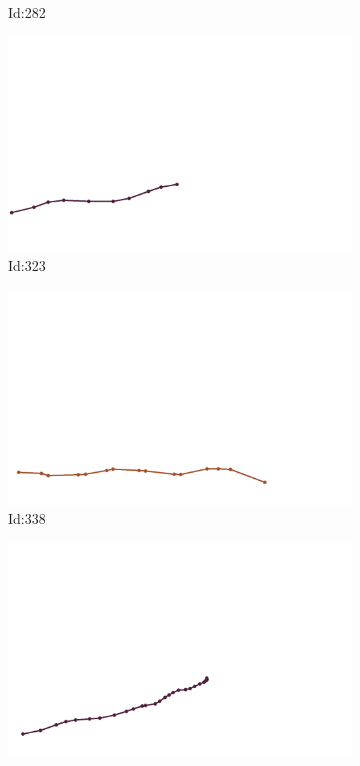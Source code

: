 \documentclass[12pt,twoside]{report}
\begin{document}
\begin{figure}
\begin{subfigure}[b]{0.20\textwidth}
\caption{Id:282}
\end{subfigure}
\begin{subfigure}[b]{0.20\textwidth}
\centering
\includegraphics[width=\textwidth]{../trajectories/323.png}
\caption{Id:323}
\end{subfigure}
\begin{subfigure}[b]{0.20\textwidth}
\centering
\includegraphics[width=\textwidth]{../trajectories/338.png}
\caption{Id:338}
\end{subfigure}
\begin{subfigure}[b]{0.20\textwidth}
\centering
\includegraphics[width=\textwidth]{../trajectories/344.png}

\end{subfigure}
\end{figure}
\end{document}
